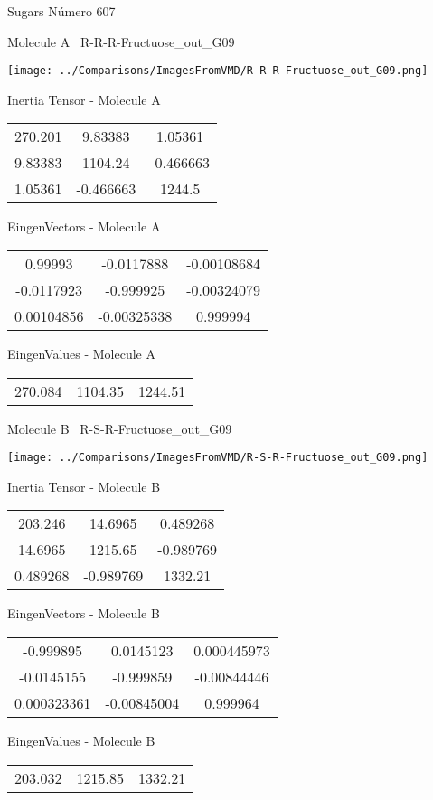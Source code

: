 \vtab[-3cm]
\begin{center}
{\large Sugars \tab Número 607}
\end{center}
\begin{multicols}{2}
\begin{center}

Molecule A \
R-R-R-Fructuose\_out\_G09

\texttt{[image: ../Comparisons/ImagesFromVMD/R-R-R-Fructuose\_out\_G09.png]}

Inertia Tensor - Molecule A \\
\begin{tabular}{|c c c|}
270.201	 & 	9.83383	 & 	1.05361	 \\
9.83383	 & 	1104.24	 & 	-0.466663	 \\
1.05361	 & 	-0.466663	 & 	1244.5
\end{tabular}

\vtab
 EingenVectors - Molecule A     \\
\begin{tabular}{|c c c|}
0.99993	 & 	-0.0117888	 & 	-0.00108684	 \\
-0.0117923	 & 	-0.999925	 & 	-0.00324079	 \\
0.00104856	 & 	-0.00325338	 & 	0.999994
\end{tabular}

\vtab
 EingenValues - Molecule A     \\
\begin{tabular}{|c c c|}
270.084	 & 	1104.35	 & 	1244.51	 \\
\end{tabular}
\columnbreak

Molecule B \
R-S-R-Fructuose\_out\_G09

\texttt{[image: ../Comparisons/ImagesFromVMD/R-S-R-Fructuose\_out\_G09.png]}

Inertia Tensor - Molecule B \\
\begin{tabular}{|c c c|}
203.246	 & 	14.6965	 & 	0.489268	 \\
14.6965	 & 	1215.65	 & 	-0.989769	 \\
0.489268	 & 	-0.989769	 & 	1332.21
\end{tabular}

\vtab
 EingenVectors - Molecule B     \\
\begin{tabular}{|c c c|}
-0.999895	 & 	0.0145123	 & 	0.000445973	 \\
-0.0145155	 & 	-0.999859	 & 	-0.00844446	 \\
0.000323361	 & 	-0.00845004	 & 	0.999964
\end{tabular}

\vtab
 EingenValues - Molecule B     \\
\begin{tabular}{|c c c|}
203.032	 & 	1215.85	 & 	1332.21	 \\
\end{tabular}

\end{center}
\end{multicols}

